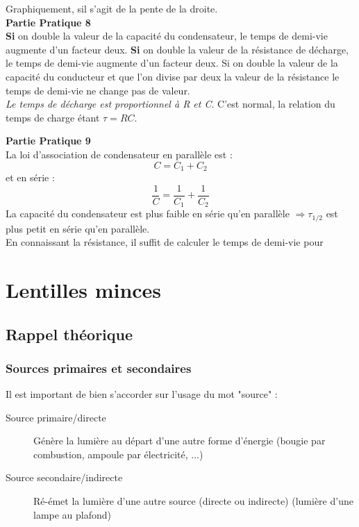 \documentclass	[11pt, a4paper, openany]{book}
\begin{document}
		Graphiquement, sil s'agit de la pente de la droite.\\
		
		\textbf{Partie Pratique 8}\\
		\textbf{Si} on double la valeur de la capacité du condensateur, le temps de demi-vie augmente d'un facteur deux. \textbf{Si} on double la valeur de la résistance de décharge, le temps de demi-vie augmente d'un facteur deux. Si on double la valeur de la capacité du conducteur et que l'on divise par deux la valeur de la résistance le temps de demi-vie ne change pas de valeur.\\
		\textit{Le temps de décharge est proportionnel à R et C}. C'est normal, la relation du temps de charge étant $\tau = RC$.
		
		\textbf{Partie Pratique 9}\\
		La loi d'association de condensateur en parallèle est : 
		\begin{equation}
			C = C_1 + C_2
		\end{equation}
		et en série : 
		\begin{equation}
			\frac{1}{C} = \frac{1}{C_1} + \frac{1}{C_2}
		\end{equation}
		La capacité du condensateur est plus faible en série qu'en parallèle $\Rightarrow \tau_{1/2}$ est plus petit en série qu'en parallèle.\\
		En connaissant la résistance, il suffit de calculer le temps de demi-vie pour 
		
		
		
		
		
		
		
		\newpage
		\section{Lentilles minces}
		\subsection{Rappel théorique}
		\subsubsection*{Sources primaires et secondaires}
		Il est important de bien s'accorder sur l'usage du mot "source" :
		\begin{description}
			\item[Source primaire/directe] Génère la lumière au départ d'une autre forme d'énergie (bougie par combustion, ampoule par électricité, ...)
			\item[Source secondaire/indirecte] Ré-émet la lumière d'une autre source (directe ou indirecte) (lumière d'une lampe au plafond)
		\end{description}
		
\end{document}
